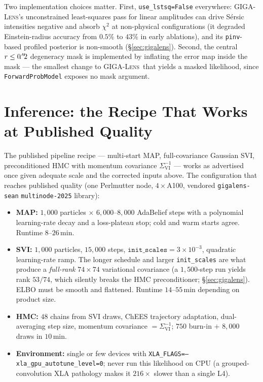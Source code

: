 \documentclass[11pt,letterpaper]{article}
\newcommand{\gigalens}{\textsc{GIGA-Lens}}
\begin{document}
Two implementation choices matter. First,
\texttt{use\_lstsq=False} everywhere: \gigalens's unconstrained
least-squares pass for linear amplitudes can drive S\'{e}rsic
intensities negative and absorb $\chi^{2}$ at non-physical
configurations (it degraded Einstein-radius accuracy from $0.5\%$ to
$43\%$ in early ablations), and its \texttt{pinv}-based profiled
posterior is non-smooth (\S\ref{sec:gigalens}). Second, the central
$r\le0\mbox{$\!\!\,.{}^{\prime\prime}\!\!\,$}2$ degeneracy mask is implemented by inflating the error
map inside the mask --- the smallest change to \gigalens\ that yields a
masked likelihood, since \texttt{ForwardProbModel} exposes no mask
argument.

\section{Inference: the Recipe That Works at Published Quality}
\label{sec:inference}

The published pipeline recipe --- multi-start MAP, full-covariance
Gaussian SVI, preconditioned HMC with momentum covariance
$\Sigma_{\mathrm{VI}}^{-1}$ --- works as advertised once given adequate
scale and the corrected inputs above. The configuration that reaches
published quality (one Perlmutter node, $4\times$A100, vendored
\texttt{gigalens-sean} \texttt{multinode-2025} library):

\begin{itemize}
\item {\bf MAP:} $1{,}000$ particles $\times$ $6{,}000$--$8{,}000$
AdaBelief steps with a polynomial learning-rate decay and a
loss-plateau stop; cold and warm starts agree. Runtime $8$--$26$\,min.
\item {\bf SVI:} $1{,}000$ particles, $15{,}000$ steps,
$\texttt{init\_scales}=3\times10^{-3}$, quadratic learning-rate ramp.
The longer schedule and larger \texttt{init\_scales} are what produce a
{\it full-rank} $74\times74$ variational covariance (a $1{,}500$-step
run yields rank $53/74$, which silently breaks the HMC preconditioner;
\S\ref{sec:gigalens}). ELBO must be smooth and flattened. Runtime
$14$--$55$\,min depending on product size.
\item {\bf HMC:} $48$ chains from SVI draws, ChEES trajectory
adaptation, dual-averaging step size, momentum covariance
$=\Sigma_{\mathrm{VI}}^{-1}$; $750$ burn-in $+$ $8{,}000$ draws in
$10$\,min.
\item {\bf Environment:} single or few devices with
\texttt{XLA\_FLAGS=--xla\_gpu\_autotune\_level=0}; never run this
likelihood on CPU (a grouped-convolution XLA pathology makes it
$216\times$ slower than a single L4).
\end{itemize}
\end{document}
